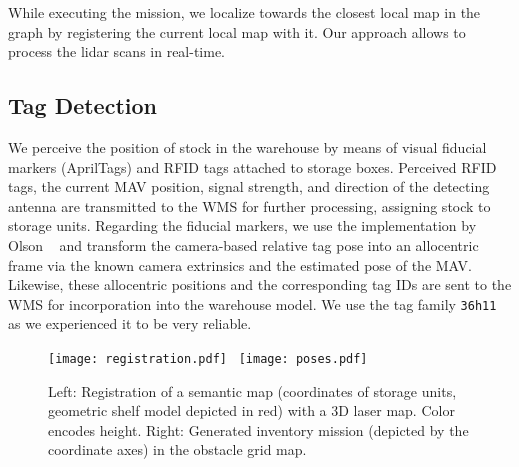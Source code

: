 While executing the mission, we localize towards the closest local map in the graph by registering the current local map with it.
Our approach allows to process the lidar scans in real-time.

\subsection{Tag Detection}
\label{sec:Tag_Detection}
We perceive the position of stock in the warehouse by means of visual fiducial markers (AprilTags) and RFID tags attached to storage boxes.
Perceived RFID tags, the current MAV position, signal strength, and direction of the detecting antenna are transmitted to the WMS for further processing, \eg assigning stock to storage units.
Regarding the fiducial markers, we use the implementation by Olson \etal~\cite{olson2011tags} and transform the camera-based relative tag pose into an allocentric frame via the known camera extrinsics and the estimated pose of the MAV. Likewise, these allocentric positions and the corresponding tag IDs are sent to the WMS for incorporation into the warehouse model. We use the tag family \texttt{36h11} as we experienced it to be very reliable.

\begin{figure}[t]
  \centering
  \texttt{[image: registration.pdf]}~
  \texttt{[image: poses.pdf]}%
  \vspace{-1ex}
  \caption{Left: Registration of a semantic map (coordinates of storage units, geometric shelf model depicted in red) with a 3D laser map. Color encodes height. Right: Generated inventory mission (depicted by the coordinate axes) in the obstacle grid map.}
  \label{fig:registration}
  \vspace{-3ex}
\end{figure}


